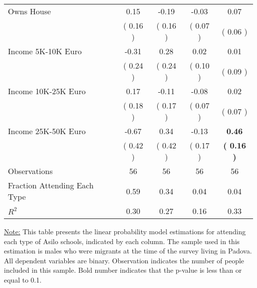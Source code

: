 \begin{table}[H]
{\begin{tabular}{lcccc}
\quad Owns House &      0.15 &     -0.19 &     -0.03 &      0.07 \\
\quad  & (     0.16 ) & (     0.16 )  & (     0.07 )  & (     0.06 )  \\
\quad Income 5K-10K Euro &     -0.31 &      0.28 &      0.02 &      0.01 \\
\quad  & (     0.24 ) & (     0.24 )  & (     0.10 )  & (     0.09 )  \\
\quad Income 10K-25K Euro &      0.17 &     -0.11 &     -0.08 &      0.02 \\
\quad  & (     0.18 ) & (     0.17 )  & (     0.07 )  & (     0.07 )  \\
\quad Income 25K-50K Euro &     -0.67 &      0.34 &     -0.13 & \textbf{     0.46} \\
\quad  & (     0.42 ) & (     0.42 )  & (     0.17 )  & \textbf{(     0.16 )}  \\
\midrule
Observations & 56 & 56 & 56 & 56 \\
Fraction Attending Each Type &      0.59 &      0.34 &      0.04 &      0.04 \\
\midrule
$ R^2$ &      0.30 &      0.27 &      0.16 &      0.33 \\
\bottomrule
\end{tabular}}
\end{table}
\begin{footnotesize}
\noindent\underline{Note:} This table presents the linear probability model estimations for attending each type of Asilo schools, indicated by each column. The sample used in this estimation is males who were migrants at the time of the survey living in Padova. All dependent variables are binary. Observation indicates the number of people included in this sample. Bold number indicates that the p-value is less than or equal to 0.1.
\end{footnotesize}
